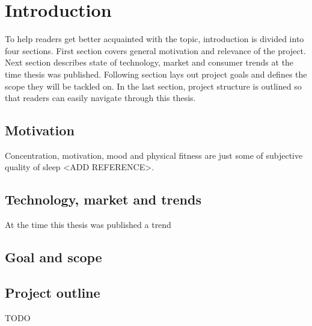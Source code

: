 \chapter{Introduction}
To help readers get better acquainted with the topic, introduction is divided into four sections. First section covers general motivation and relevance of the project. Next section describes state of technology, market and consumer trends at the time thesis was published. Following section lays out project goals and defines the scope they will be tackled on. In the last section, project structure is outlined so that readers can easily navigate through this thesis.

\section{Motivation}
Concentration, motivation, mood and physical fitness are just some of subjective quality of sleep <ADD REFERENCE>.

\section{Technology, market and trends}
At the time this thesis was published a trend

\section{Goal and scope}


\section{Project outline}
TODO